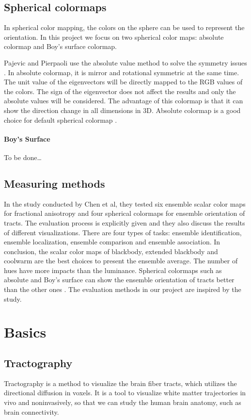 \documentclass[a4paper, 12pt]{report}
\begin{document}
\section{Spherical colormaps}

In spherical color mapping, the colors on the sphere can be used to represent the orientation. In this project we focus on two spherical color maps: absolute colormap and Boy’s surface colormap.


Pajevic and Pierpaoli use the absolute value method to solve the symmetry issues \cite{pajevic}. In absolute colormap, it is mirror and rotational symmetric at the same time. The unit value of the eigenvectors will be directly mapped to the RGB values of the colors. The sign of the eigenvector does not affect the results and only the absolute values will be considered. The advantage of this colormap is that it can show the direction change in all dimensions in 3D. Absolute colormap is a good choice for default spherical colormap \cite{moreland2019}.

\subsubsection*{Boy’s Surface}  
To be done…

\section{Measuring methods}
In the study conducted by Chen et al, they tested six ensemble scalar color maps for fractional anisotropy and four spherical colormaps for ensemble orientation of tracts. The evaluation process is explicitly given and they also discuss the results of different visualizations. There are four types of tasks: ensemble identification, ensemble localization, ensemble comparison and ensemble association. In conclusion, the scalar color maps of blackbody, extended blackbody and coolwarm are the best choices to present the ensemble average. The number of hues have more impacts than the luminance. Spherical colormaps such as absolute and Boy’s surface can show the ensemble orientation of tracts better than the other ones \cite{moreland2019}. The evaluation methods in our project are inspired by the study.

\chapter{Basics}

\section{Tractography}
Tractography is a method to visualize the brain fiber tracts, which utilizes the directional diffusion in voxels. It is a tool to visualize white matter trajectories in vivo and noninvasively, so that we can study the human brain anatomy, such as brain connectivity.
\end{document}
